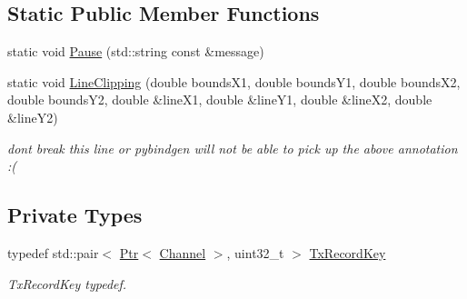 \subsection*{Static Public Member Functions}
\begin{DoxyCompactItemize}
\item 
static void \hyperlink{classns3_1_1PyViz_a512f3901857d4999c66a89ead412bae1}{Pause} (std\+::string const \&message)
\item 
static void \hyperlink{classns3_1_1PyViz_aab835dc8a79170c0f0fef7b2bba45cdb}{Line\+Clipping} (double bounds\+X1, double bounds\+Y1, double bounds\+X2, double bounds\+Y2, double \&line\+X1, double \&line\+Y1, double \&line\+X2, double \&line\+Y2)
\begin{DoxyCompactList}\small\item\em don\textquotesingle{}t break this line or pybindgen will not be able to pick up the above annotation \+:( \end{DoxyCompactList}\end{DoxyCompactItemize}
\subsection*{Private Types}
\begin{DoxyCompactItemize}
\item 
typedef std\+::pair$<$ \hyperlink{classns3_1_1Ptr}{Ptr}$<$ \hyperlink{classns3_1_1Channel}{Channel} $>$, uint32\+\_\+t $>$ \hyperlink{classns3_1_1PyViz_afe99c7883d8999b0d669eceda3254caf}{Tx\+Record\+Key}
\begin{DoxyCompactList}\small\item\em Tx\+Record\+Key typedef. \end{DoxyCompactList}\end{DoxyCompactItemize}
